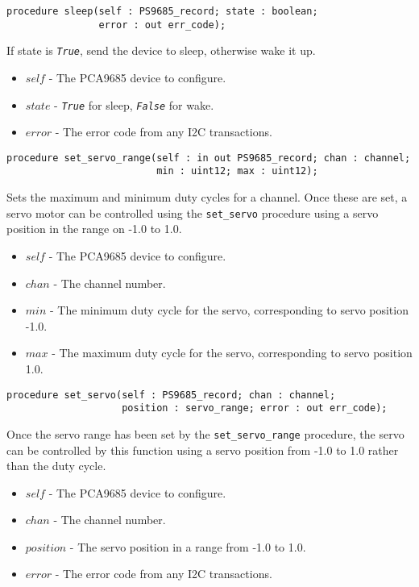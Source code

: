 \documentclass[10pt, openany]{book}
\newcommand{\indexfunc}[1]{\index[func]{#1}}
\newcommand{\function}[1]{\texttt{#1}}
\newcommand{\constant}[1]{\emph{\texttt{#1}}}
\begin{document}
\begin{lstlisting}
procedure sleep(self : PS9685_record; state : boolean;
                error : out err_code);
\end{lstlisting}
\indexfunc{sleep}
If state is \constant{True}, send the device to sleep, otherwise wake it up.
\begin{itemize}
  \item $self$ - The PCA9685 device to configure.
  \item $state$ - \constant{True} for sleep, \constant{False} for wake.
  \item $error$ - The error code from any I2C transactions.
\end{itemize}

\begin{lstlisting}
procedure set_servo_range(self : in out PS9685_record; chan : channel;
                          min : uint12; max : uint12);
\end{lstlisting}
\indexfunc{set\_servo\_range}
Sets the maximum and minimum duty cycles for a channel.  Once these are set, a servo motor can be controlled using the \function{set\_servo} procedure using a servo position in the range on -1.0 to 1.0.
\begin{itemize}
  \item $self$ - The PCA9685 device to configure.
  \item $chan$ - The channel number.
  \item $min$ - The minimum duty cycle for the servo, corresponding to servo position -1.0.
  \item $max$ - The maximum duty cycle for the servo, corresponding to servo position 1.0.
\end{itemize}

\begin{lstlisting}
procedure set_servo(self : PS9685_record; chan : channel;
                    position : servo_range; error : out err_code);
\end{lstlisting}
\indexfunc{set\_servo}
Once the servo range has been set by the \function{set\_servo\_range} procedure, the servo can be controlled by this function using a servo position from -1.0 to 1.0 rather than the duty cycle.
\begin{itemize}
  \item $self$ - The PCA9685 device to configure.
  \item $chan$ - The channel number.
  \item $position$ - The servo position in a range from -1.0 to 1.0.
  \item $error$ - The error code from any I2C transactions.
\end{itemize}
\end{document}
